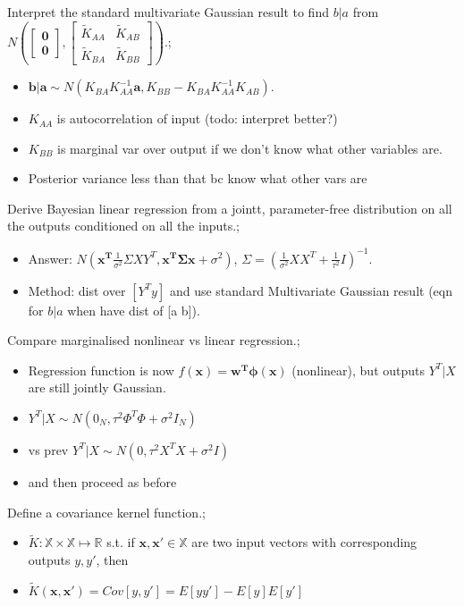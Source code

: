\documentclass{article}
\begin{document}
Interpret the standard multivariate Gaussian result to find $b|a$ from $N(\begin{bmatrix}\mathbf{0} \\ \mathbf{0} \end{bmatrix}, \begin{bmatrix}\tilde{K}_{AA} & \tilde{K}_{AB} \\ \tilde{K}_{BA} & \tilde{K}_{BB} \end{bmatrix})$.; \begin{itemize}
    \item $\mathbf{b|a}\sim N(K_{BA}K_{AA}^{-1}\mathbf{a}, K_{BB}-K_{BA}K_{AA}^{-1}K_{AB})$.
    \item $K_{AA}$ is autocorrelation of input (todo: interpret better?)
    \item $K_{BB}$ is marginal var over output if we don't know what other variables are.
    \item Posterior variance less than that bc know what other vars are
\end{itemize}

Derive Bayesian linear regression from a jointt, parameter-free distribution on all the outputs conditioned on all the inputs.; \begin{itemize}
    \item Answer: $N(\mathbf{x^T}\frac{1}{\sigma^2}\Sigma XY^T, \mathbf{x^T\Sigma x}+\sigma^2)$, $\Sigma=(\frac{1}{\sigma^2}XX^T+\frac{1}{\tau^2}I)^{-1}$.
    \item Method: dist over $[Y^T y]$ and use standard Multivariate Gaussian result (eqn for $b|a$ when have dist of [a b]).
\end{itemize}

Compare marginalised nonlinear vs linear regression.; \begin{itemize}
    \item Regression function is now $f(\mathbf{x})=\mathbf{w^T\phi(x)}$ (nonlinear), but outputs $Y^T|X$ are still jointly Gaussian.
    \item $Y^T|X\sim N(0_N, \tau^2\Phi^T\Phi+\sigma^2I_N)$
    \item vs prev $Y^T|X\sim N(0, \tau^2X^TX+\sigma^2I)$
    \item and then proceed as before
\end{itemize}

Define a covariance kernel function.; \begin{itemize}
    \item $\tilde{K}:\mathbb{X}\times \mathbb{X}\mapsto \mathbb{R}$ s.t. if $\mathbf{x, x'} \in \mathbb{X}$ are two input vectors with corresponding outputs $y, y'$, then
    \item $\tilde{K}(\mathbf{x, x'})=Cov[y, y']=E[yy']-E[y]E[y']$
\end{itemize} 
\end{document}
